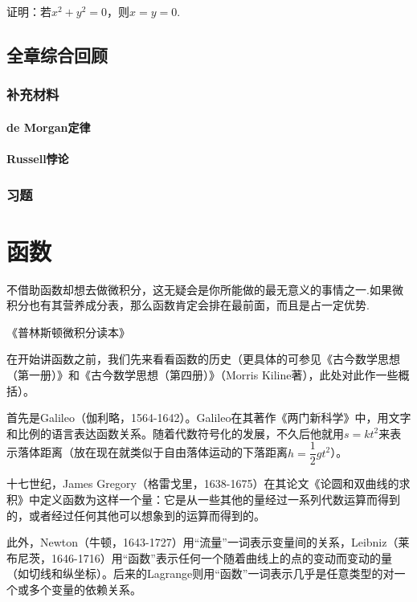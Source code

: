\documentclass[lang=cn,math=cm,chinesefont=nofont,11pt,scheme=chinese,twocol]{elegantbook}
\begin{document}
\begin{exercise}\label{2003RJA_xx2-1_P7.exp4}
  证明：若$x^2+y^2=0$，则$x=y=0$.
\end{exercise}

\section{全章综合回顾}

\subsection{补充材料}

\subsubsection{de Morgan定律}

\subsubsection{Russell悖论}

\subsection{习题}

\chapter{函数}

\epigraph{不借助函数却想去做微积分，这无疑会是你所能做的最无意义的事情之一.如果微积分也有其营养成分表，那么函数肯定会排在最前面，而且是占一定优势.}{《普林斯顿微积分读本》}

在开始讲函数之前，我们先来看看函数的历史（更具体的可参见《古今数学思想（第一册）》和《古今数学思想（第四册）》（Morris Kiline著），此处对此作一些概括）。

首先是Galileo（伽利略，1564-1642）。Galileo在其著作《两门新科学》中，用文字和比例的语言表达函数关系。随着代数符号化的发展，不久后他就用$s=kt^2$来表示落体距离（放在现在就类似于自由落体运动的下落距离$h=\dfrac{1}{2}gt^2$）。

十七世纪，James Gregory（格雷戈里，1638-1675）在其论文《论圆和双曲线的求积》中定义函数为这样一个量：它是从一些其他的量经过一系列代数运算而得到的，或者经过任何其他可以想象到的运算而得到的。

此外，Newton（牛顿，1643-1727）用“流量”一词表示变量间的关系，Leibniz（莱布尼茨，1646-1716）用“函数”表示任何一个随着曲线上的点的变动而变动的量（如切线和纵坐标）。后来的Lagrange则用“函数”一词表示几乎是任意类型的对一个或多个变量的依赖关系。
\end{document}
